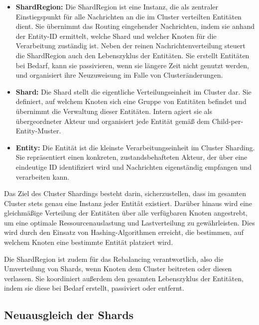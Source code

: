 \begin{itemize}
    \item \textbf{ShardRegion:}
    Die ShardRegion ist eine Instanz, die als zentraler Einstiegspunkt für alle Nachrichten an die im 
    Cluster verteilten Entitäten dient. Sie übernimmt das Routing eingehender Nachrichten, indem sie 
    anhand der Entity-ID ermittelt, welche Shard und welcher Knoten für die Verarbeitung zuständig ist.
    Neben der reinen Nachrichtenverteilung steuert die ShardRegion auch den Lebenszyklus der Entitäten. 
    Sie erstellt Entitäten bei Bedarf, kann sie passivieren, wenn sie längere Zeit nicht genutzt werden, 
    und organisiert ihre Neuzuweisung im Falle von Clusteränderungen.
    \parencite{cluster_sharding_petabridge}

    \item \textbf{Shard:}
    Die Shard stellt die eigentliche Verteilungseinheit im Cluster dar. Sie definiert, auf welchem Knoten 
    sich eine Gruppe von Entitäten befindet und übernimmt die Verwaltung dieser Entitäten. Intern agiert 
    sie als übergeordneter Akteur und organisiert jede Entität gemäß dem Child-per-Entity-Muster.
    \parencite{cluster_sharding_petabridge}

    \item \textbf{Entity:}
    Die Entität ist die kleinste Verarbeitungseinheit im Cluster Sharding. Sie repräsentiert einen konkreten, 
    zustandsbehafteten Akteur, der über eine eindeutige ID identifiziert wird und Nachrichten eigenständig 
    empfangen und verarbeiten kann.
    \parencite{cluster_sharding_petabridge}
\end{itemize}

Das Ziel des Cluster Shardings besteht darin, sicherzustellen, dass im gesamten Cluster stets genau eine Instanz 
jeder Entität existiert. Darüber hinaus wird eine gleichmäßige Verteilung der Entitäten über alle verfügbaren 
Knoten angestrebt, um eine optimale Ressourcenauslastung und Lastverteilung zu gewährleisten. Dies wird durch den 
Einsatz von Hashing-Algorithmen erreicht, die bestimmen, auf welchem Knoten eine bestimmte Entität platziert wird.

Die ShardRegion ist zudem für das Rebalancing verantwortlich, also die Umverteilung von Shards, wenn Knoten dem 
Cluster beitreten oder diesen verlassen. Sie koordiniert außerdem den gesamten Lebenszyklus der Entitäten, 
indem sie diese bei Bedarf erstellt, passiviert oder entfernt.
\parencite{cluster_sharding_petabridge}

\subsection{Neuausgleich der Shards}

